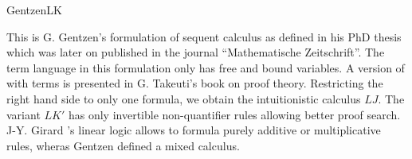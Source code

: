 \begin{entry}{GentzenLK}
\begin{clarifications}
 \end{clarifications}

 \begin{history}
This is G. Gentzen's formulation of sequent calculus as defined in his PhD thesis which was later on published in the journal ``Mathematische Zeitschrift''\cite{Gentzen1934}. The term language in this formulation only has free and bound variables. A version of \LK with terms is presented in G. Takeuti's book on proof theory\cite{Takeuti1975}. Restricting the right hand side to only one formula, we obtain the intuitionistic calculus $LJ$. The variant $LK'$ has only invertible non-quantifier rules allowing better proof search. J{-}Y. Girard 's linear logic\cite{Girard1987} allows to formula purely additive or multiplicative rules, wheras Gentzen defined a mixed calculus.
\end{history}








\end{entry}
